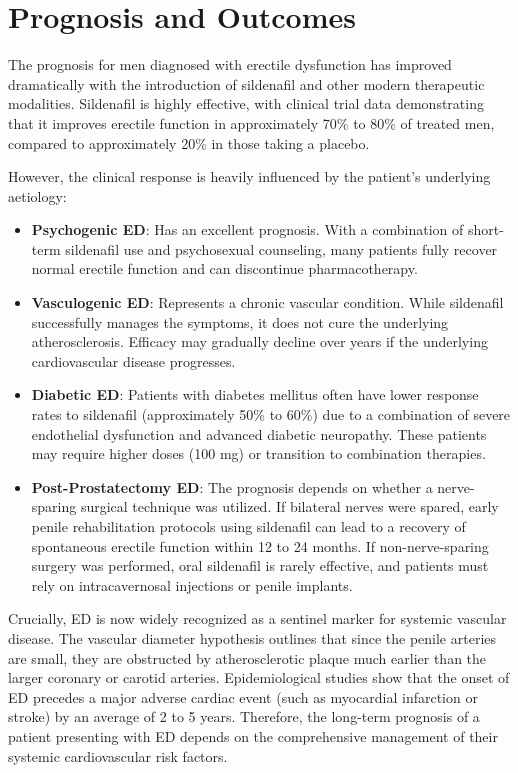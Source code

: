 \section*{Prognosis and Outcomes}
The prognosis for men diagnosed with erectile dysfunction has improved dramatically with the introduction of sildenafil and other modern therapeutic modalities. Sildenafil is highly effective, with clinical trial data demonstrating that it improves erectile function in approximately 70\% to 80\% of treated men, compared to approximately 20\% in those taking a placebo.

However, the clinical response is heavily influenced by the patient's underlying aetiology:
\begin{itemize}
    \item \textbf{Psychogenic ED}: Has an excellent prognosis. With a combination of short-term sildenafil use and psychosexual counseling, many patients fully recover normal erectile function and can discontinue pharmacotherapy.
    \item \textbf{Vasculogenic ED}: Represents a chronic vascular condition. While sildenafil successfully manages the symptoms, it does not cure the underlying atherosclerosis. Efficacy may gradually decline over years if the underlying cardiovascular disease progresses.
    \item \textbf{Diabetic ED}: Patients with diabetes mellitus often have lower response rates to sildenafil (approximately 50\% to 60\%) due to a combination of severe endothelial dysfunction and advanced diabetic neuropathy. These patients may require higher doses (100 mg) or transition to combination therapies.
    \item \textbf{Post-Prostatectomy ED}: The prognosis depends on whether a nerve-sparing surgical technique was utilized. If bilateral nerves were spared, early penile rehabilitation protocols using sildenafil can lead to a recovery of spontaneous erectile function within 12 to 24 months. If non-nerve-sparing surgery was performed, oral sildenafil is rarely effective, and patients must rely on intracavernosal injections or penile implants.
\end{itemize}

Crucially, ED is now widely recognized as a sentinel marker for systemic vascular disease. The vascular diameter hypothesis outlines that since the penile arteries are small, they are obstructed by atherosclerotic plaque much earlier than the larger coronary or carotid arteries. Epidemiological studies show that the onset of ED precedes a major adverse cardiac event (such as myocardial infarction or stroke) by an average of 2 to 5 years. Therefore, the long-term prognosis of a patient presenting with ED depends on the comprehensive management of their systemic cardiovascular risk factors.

